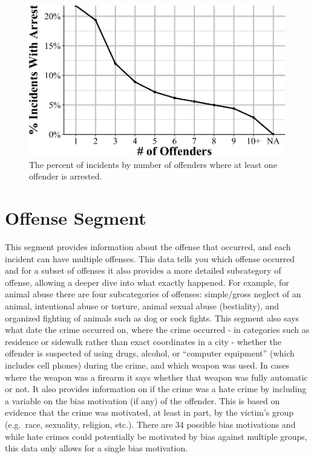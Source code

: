 \documentclass[
  12pt,
  openany]{book}
\begin{document}
\begin{figure}

{\centering \includegraphics[width=0.9\linewidth]{12_nibrs_administrative_files/figure-latex/administrativeArrestsAny-1} 

}

\caption{The percent of incidents by number of offenders where at least one offender is arrested.}\label{fig:administrativeArrestsAny}
\end{figure}

\chapter{Offense Segment}\label{offenseSegment}

This segment provides information about the offense that occurred, and each incident can have multiple offenses. This data tells you which offense occurred and for a subset of offenses it also provides a more detailed subcategory of offense, allowing a deeper dive into what exactly happened. For example, for animal abuse there are four subcategories of offenses: simple/gross neglect of an animal, intentional abuse or torture, animal sexual abuse (bestiality), and organized fighting of animals such as dog or cock fights. This segment also says what date the crime occurred on, where the crime occurred - in categories such as residence or sidewalk rather than exact coordinates in a city - whether the offender is suspected of using drugs, alcohol, or ``computer equipment'' (which includes cell phones) during the crime, and which weapon was used. In cases where the weapon was a firearm it says whether that weapon was fully automatic or not. It also provides information on if the crime was a hate crime by including a variable on the bias motivation (if any) of the offender. This is based on evidence that the crime was motivated, at least in part, by the victim's group (e.g.~race, sexuality, religion, etc.). There are 34 possible bias motivations and while hate crimes could potentially be motivated by bias against multiple groups, this data only allows for a single bias motivation.
\end{document}
